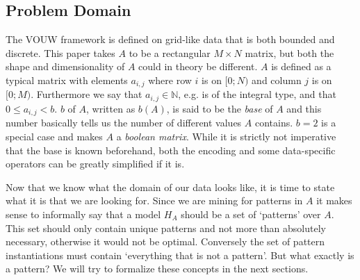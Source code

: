 \documentclass{llncs}
\begin{document}
\subsection{Problem Domain}

The VOUW framework is defined on grid-like data that is both bounded and discrete. This paper takes $A$ to be a rectangular $M\times N$ matrix, but both the shape and dimensionality of $A$ could in theory be different. $A$ is defined as a typical matrix with elements $a_{i,j}$ where row $i$ is on $[0;N)$ and column $j$ is on $[0;M)$. Furthermore we say that $a_{i,j} \in \mathbb{N}$, e.g. is of the integral type, and that $0 \leq a_{i,j} < b$. $b$ of $A$, written as $b(A)$, is said to be the \emph{base} of $A$ and this number basically tells us the number of different values $A$ contains. $b=2$ is a special case and makes $A$ a \emph{boolean matrix}. While it is strictly not imperative that the base is known beforehand, both the encoding and some data-specific operators can be greatly simplified if it is.

Now that we know what the domain of our data looks like, it is time to state what it is that we are looking for. Since we are mining for patterns in $A$ it makes sense to informally say that a model $H_A$ should be a set of `patterns' over $A$. This set should only contain unique patterns and not more than absolutely necessary, otherwise it would not be optimal. Conversely the set of pattern instantiations must contain `everything that is not a pattern'. But what exactly is a pattern? We will try to formalize these concepts in the next sections.

\end{document}
